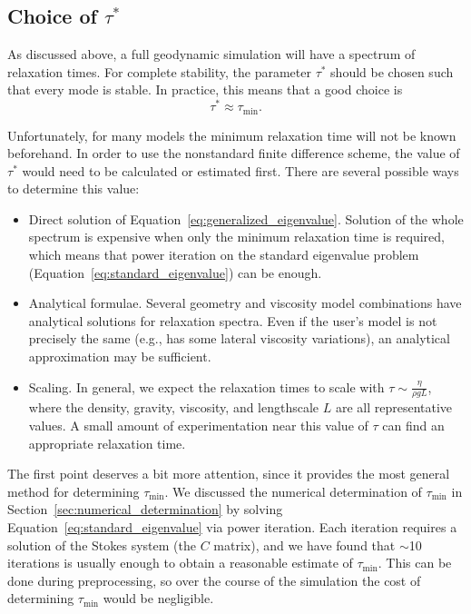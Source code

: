 \documentclass[preprint,12pt,authoryear]{elsarticle}
\begin{document}
\subsection{Choice of $\tau^*$}
As discussed above, a full geodynamic simulation will have a spectrum of relaxation times.
For complete stability, the parameter $\tau^*$ should be chosen such that every mode is stable.
In practice, this means that a good choice is 
\begin{equation}
\tau^* \approx \tau_{\mathrm{min}}.
\label{eq:tau_choice}
\end{equation}

Unfortunately, for many models the minimum relaxation time will not be known beforehand. 
In order to use the nonstandard finite difference scheme, the value of $\tau^*$ would need 
to be calculated or estimated first.  There are several possible ways to determine this value:

\begin{itemize}
\item Direct solution of Equation~\eqref{eq:generalized_eigenvalue}. Solution of the whole spectrum is expensive
when only the minimum relaxation time is required, which means that power iteration on 
the standard eigenvalue problem (Equation~\eqref{eq:standard_eigenvalue}) can be enough.
\item Analytical formulae. Several geometry and viscosity model combinations have analytical solutions
for relaxation spectra. Even if the user's model is not precisely the same (e.g., has some lateral viscosity
variations), an analytical approximation may be sufficient.
\item Scaling. In general, we expect the relaxation times to scale with $\tau \sim \frac{\eta}{\rho g L}$,
where the density, gravity, viscosity, and lengthscale $L$ are all representative values.  A small amount
of experimentation near this value of $\tau$ can find an appropriate relaxation time.
\end{itemize} 

The first point deserves a bit more attention, since it provides the most general method for determining $\tau_\mathrm{min}$.
We discussed the numerical determination of $\tau_\mathrm{min}$ in Section~\ref{sec:numerical_determination}
by solving Equation~\eqref{eq:standard_eigenvalue} via power iteration.
Each iteration requires a solution of the Stokes system (the $C$ matrix), and we have found
that $\sim$10 iterations is usually enough to obtain a reasonable estimate of $\tau_\mathrm{min}$.
This can be done during preprocessing, so over the course of the simulation the cost of determining
$\tau_\mathrm{min}$ would be negligible.
\end{document}
